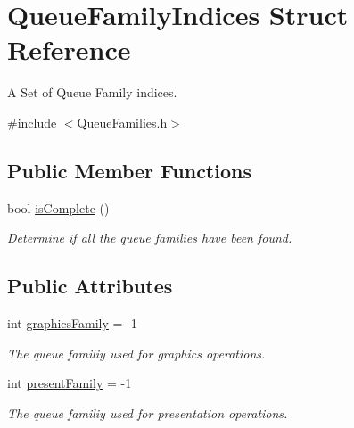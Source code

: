 \hypertarget{struct_queue_family_indices}{}\section{Queue\+Family\+Indices Struct Reference}
\label{struct_queue_family_indices}


A Set of Queue Family indices.  




{\ttfamily \#include $<$Queue\+Families.\+h$>$}

\subsection*{Public Member Functions}
\begin{DoxyCompactItemize}
\item 
\mbox{\label{struct_queue_family_indices_a652cdfabe4719ae21a701e77d57e7899}} 
bool \mbox{\hyperlink{struct_queue_family_indices_a652cdfabe4719ae21a701e77d57e7899}{is\+Complete}} ()
\begin{DoxyCompactList}\small\item\em Determine if all the queue families have been found. \end{DoxyCompactList}\end{DoxyCompactItemize}
\subsection*{Public Attributes}
\begin{DoxyCompactItemize}
\item 
\mbox{\label{struct_queue_family_indices_ade0723c4a6f188f83c8c8729227f3d17}} 
int \mbox{\hyperlink{struct_queue_family_indices_ade0723c4a6f188f83c8c8729227f3d17}{graphics\+Family}} = -\/1
\begin{DoxyCompactList}\small\item\em The queue familiy used for graphics operations. \end{DoxyCompactList}\item 
\mbox{\label{struct_queue_family_indices_a28a4e75b8e74d1153689ded81d660bad}} 
int \mbox{\hyperlink{struct_queue_family_indices_a28a4e75b8e74d1153689ded81d660bad}{present\+Family}} = -\/1
\begin{DoxyCompactList}\small\item\em The queue familiy used for presentation operations. \end{DoxyCompactList}\end{DoxyCompactItemize}


